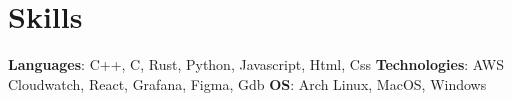 \documentclass[letterpaper,11pt]{article}
\newcommand{\resumeSubHeadingListStart}{\begin{itemize}[leftmargin=*]}
\newcommand{\resumeSubHeadingListEnd}{\end{itemize}}
\begin{document}
%



\section{Skills}
      \textbf{Languages}{: C++, C, Rust, Python, Javascript, Html, Css} \break
      \textbf{Technologies}{: AWS Cloudwatch, React, Grafana, Figma, Gdb} \break
      \textbf{OS}{: Arch Linux, MacOS, Windows}
\end{document}
